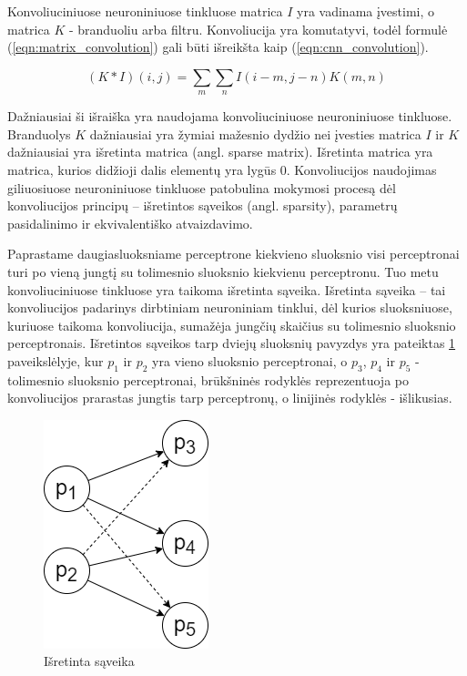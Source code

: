 Konvoliuciniuose neuroniniuose tinkluose matrica $I$ yra vadinama įvestimi, o matrica $K$ - branduoliu arba filtru. Konvoliucija yra komutatyvi, todėl formulė (\ref{eqn:matrix_convolution}) gali būti išreikšta kaip (\ref{eqn:cnn_convolution}).

\begin{equation}
\label{eqn:cnn_convolution}
	(K * I)(i, j) = \sum_{m} \sum_{n} I(i - m, j - n) K(m, n)
\end{equation}

Dažniausiai ši išraiška yra naudojama konvoliuciniuose neuroniniuose tinkluose. Branduolys $K$ dažniausiai yra žymiai mažesnio dydžio nei įvesties matrica $I$ ir $K$ dažniausiai yra išretinta matrica (angl. sparse matrix). Išretinta matrica yra matrica, kurios didžioji dalis elementų yra lygūs 0. Konvoliucijos naudojimas giliuosiuose neuroniniuose tinkluose patobulina mokymosi procesą dėl konvoliucijos principų -- išretintos sąveikos (angl. sparsity), parametrų pasidalinimo ir ekvivalentiško atvaizdavimo.

Paprastame daugiasluoksniame perceptrone kiekvieno sluoksnio visi perceptronai turi po vieną jungtį su tolimesnio sluoksnio kiekvienu perceptronu. Tuo metu konvoliuciniuose tinkluose yra taikoma išretinta sąveika. Išretinta sąveika -- tai konvoliucijos padarinys dirbtiniam neuroniniam tinklui, dėl kurios sluoksniuose, kuriuose taikoma konvoliucija, sumažėja jungčių skaičius su tolimesnio sluoksnio perceptronais. Išretintos sąveikos tarp dviejų sluoksnių pavyzdys yra pateiktas \ref{img:sparsity} paveikslėlyje, kur $p_1$ ir $p_2$ yra vieno sluoksnio perceptronai, o $p_3$, $p_4$ ir $p_5$ - tolimesnio sluoksnio perceptronai, brūkšninės rodyklės reprezentuoja po konvoliucijos prarastas jungtis tarp perceptronų, o linijinės rodyklės - išlikusias.

\begin{figure}[H]
	\centering
	\includegraphics[scale=0.5]{img/sparsity.png}
	\caption{Išretinta sąveika}
	\label{img:sparsity}
\end{figure}

